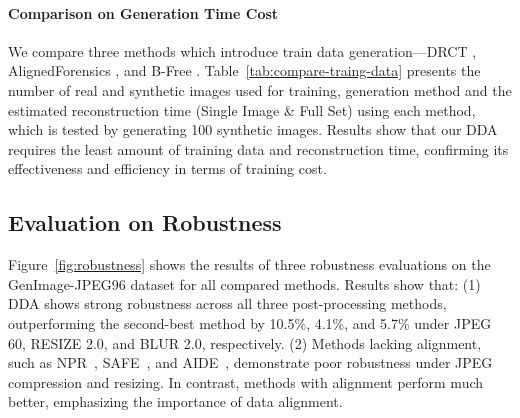 \documentclass{article}
\begin{document}



\paragraph{Comparison on Generation Time Cost} We compare three methods which introduce train data generation—DRCT \cite{chen2024drct}, AlignedForensics \cite{rajan2025aligned}, and B-Free \cite{guillaro2024bias}. Table~\ref{tab:compare-traing-data} presents the number of real and synthetic images used for training, generation method and the estimated reconstruction time (Single Image \& Full Set) using each method, which is tested by generating 100 synthetic images. Results show that our DDA requires the least amount of training data and reconstruction time, confirming its effectiveness and efficiency in terms of training cost.

\subsection{Evaluation on Robustness}
Figure~\ref{fig:robustness} shows the results of three robustness evaluations on the GenImage-JPEG96 dataset for all compared methods. Results show that: (1) DDA shows strong robustness across all three post-processing methods, outperforming the second-best method by 10.5\%, 4.1\%, and 5.7\% under JPEG 60, RESIZE 2.0, and BLUR 2.0, respectively. (2) Methods lacking alignment, such as NPR~\cite{cozzolino2024zero}, SAFE~\cite{li2024improving}, and AIDE~\cite{yan2024sanity}, demonstrate poor robustness under JPEG compression and resizing. In contrast, methods with alignment perform much better, emphasizing the importance of data alignment.
\end{document}
